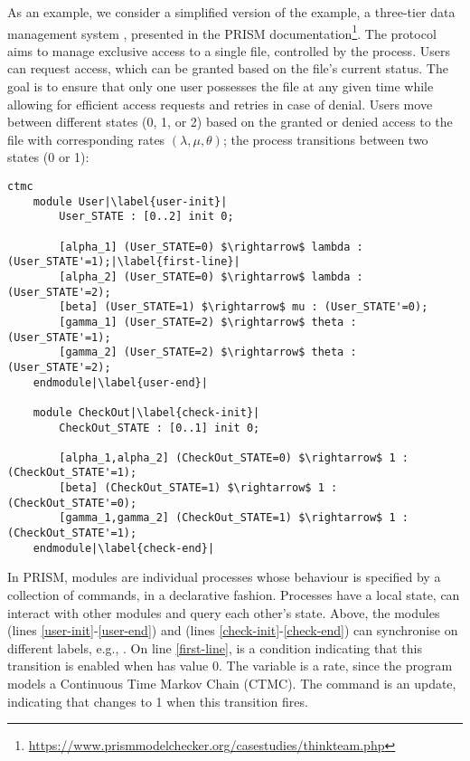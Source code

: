 As an example, we consider a simplified version of the
 example, a three-tier data management system
\cite{DBLP:journals/entcs/BeekMLGFS05}, presented in the PRISM
documentation\footnote{\url{https://www.prismmodelchecker.org/casestudies/thinkteam.php}}.
{The protocol aims to manage exclusive access to a single file,
  controlled by the  process. Users can request
  access, which can be granted based on the file's current status. The
  goal is to ensure that only one user possesses the file at any given
  time while allowing for efficient access requests and retries in
  case of denial.}  Users move between different states (0, 1, or 2)
based on the granted or denied access to the file with corresponding
rates $(\lambda, \mu, \theta)$; the  process
transitions between two states (0 or 1):
%
\begin{lstlisting}[style=prism-color,% caption={A PRISM example},captionpos=b,
  frame=none,label={example1},escapechar=|]
	ctmc 
	module User|\label{user-init}|
		User_STATE : [0..2] init 0;
	
		[alpha_1] (User_STATE=0) $\rightarrow$ lambda : (User_STATE'=1);|\label{first-line}|
		[alpha_2] (User_STATE=0) $\rightarrow$ lambda : (User_STATE'=2);
		[beta] (User_STATE=1) $\rightarrow$ mu : (User_STATE'=0);
		[gamma_1] (User_STATE=2) $\rightarrow$ theta : (User_STATE'=1);
		[gamma_2] (User_STATE=2) $\rightarrow$ theta : (User_STATE'=2);
	endmodule|\label{user-end}|
	
	module CheckOut|\label{check-init}|
		CheckOut_STATE : [0..1] init 0;
	
		[alpha_1,alpha_2] (CheckOut_STATE=0) $\rightarrow$ 1 : (CheckOut_STATE'=1);
		[beta] (CheckOut_STATE=1) $\rightarrow$ 1 : (CheckOut_STATE'=0);
		[gamma_1,gamma_2] (CheckOut_STATE=1) $\rightarrow$ 1 : (CheckOut_STATE'=1);
	endmodule|\label{check-end}|
\end{lstlisting}
%
In PRISM, modules are individual processes whose behaviour is
specified by a collection of commands, in a declarative fashion.
Processes have a local state, can interact with other modules and
query each other's state. Above, the modules  (lines
\ref{user-init}-\ref{user-end}) and  (lines
\ref{check-init}-\ref{check-end}) can synchronise on different labels, e.g., 
. %
On line \ref{first-line},  is a condition
indicating that this transition is enabled when 
has value 0. The variable  is a rate, since the
program models a Continuous Time Markov Chain (CTMC). The command
 is an update, indicating that
 changes to 1 when this transition fires.

